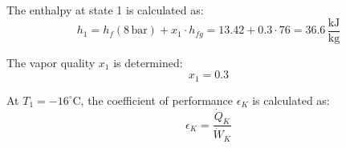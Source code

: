 The enthalpy at state 1 is calculated as:  
\[
h_1 = h_f(8 \, \text{bar}) + x_1 \cdot h_{fg} = 13.42 + 0.3 \cdot 76 = 36.6 \, \frac{\text{kJ}}{\text{kg}}
\]  

The vapor quality \( x_1 \) is determined:  
\[
x_1 = 0.3
\]  

At \( T_1 = -16^\circ \text{C} \), the coefficient of performance \( \epsilon_K \) is calculated as:  
\[
\epsilon_K = \frac{\dot{Q}_K}{\dot{W}_K}
\]